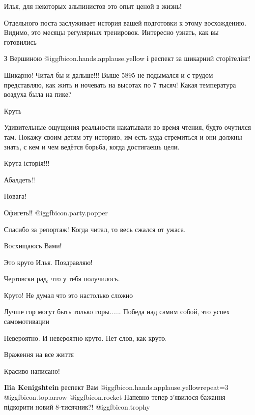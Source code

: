 \begin{itemize}

Илья, для некоторых альпинистов это опыт ценой в жизнь!

Отдельного поста заслуживает история вашей подготовки к этому восхождению.
Видимо, это месяцы регулярных тренировок. Интересно узнать, как вы готовились


З Вершиною  @igg{fbicon.hands.applause.yellow}  і респект за шикарний сторітелінг!


Шикарно! Читал бы и дальше!!! Выше 5895 не подымался и с трудом представляю,
как жить и ночевать на высотах по 7 тысяч! Какая температура воздуха была на
пике?

Круть


Удивительные ощущения реальности накатывали во время чтения, будто очутился
там. Покажу своим детям эту историю, им есть куда стремиться и они должны
знать, с кем и чем ведётся борьба, когда достигаешь цели.


Крута історія!!!

Абалдеть!!

Повага!

Офигеть!!  @igg{fbicon.party.popper} 

Спасибо за репортаж!
Когда читал, то весь сжался от ужаса.

Восхищаюсь Вами!

Это круто Илья. Поздравляю!

Чертовски рад, что у тебя получилось.

Круто! Не думал что это настолько сложно

Лучше гор могут быть только горы......
Победа над самим собой, это успех самомотивации


Невероятно. И невероятно круто. Нет слов, как круто.

Враження на все життя

Красиво написано!

\textbf{Ilia Kenigshtein} респект Вам  @igg{fbicon.hands.applause.yellow}{repeat=3}  @igg{fbicon.top.arrow}  @igg{fbicon.rocket} 
Напевно тепер з’явилося бажання підкорити новий 8-тисячник?! @igg{fbicon.trophy} 


\end{itemize}

